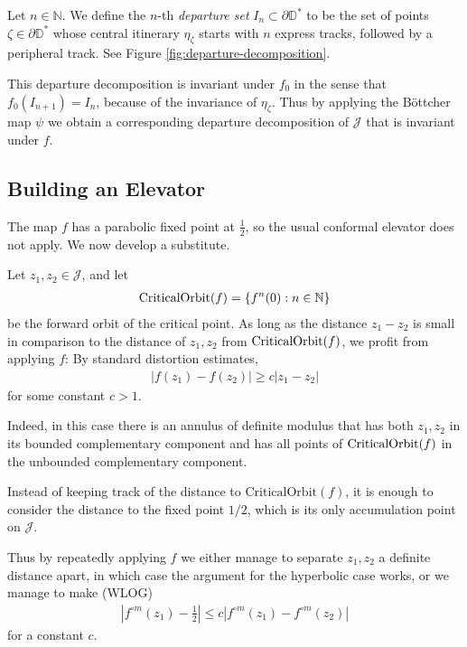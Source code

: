 \begin{definition}
Let $n \in \mathbb N$. We define the $n$-th \emph{departure set} $I_n \subset \partial \mathbb D ^*$ to be the set of points $\zeta \in \partial \mathbb D^*$ whose central itinerary $\eta_{\zeta}$ starts with $n$ express tracks, followed by a peripheral track.
See Figure \ref{fig:departure-decomposition}.
\end{definition}

This departure decomposition is invariant under $f_0$ in the sense that $f_0(I_{n+1})=I_n$, because of the invariance of $\eta _\zeta$.
Thus by applying the Böttcher map $\psi$ we obtain a corresponding departure decomposition of $\mathcal J$ that is invariant under $f$.


\subsection{Building an Elevator}

The map $f$ has a parabolic fixed point at $\frac 12$, so the usual conformal elevator does not apply. We now develop a substitute.

Let $z_1,z_2 \in \mathcal J$, and let
\begin{align*}
	\operatorname{CriticalOrbit}(f)=\{f^n(0): n \in \mathbb N\}
\end{align*} be the forward orbit of the critical point.
As long as the distance $z_1-z_2$ is small in comparison to the distance of $z_1,z_2$ from $\operatorname{CriticalOrbit}(f)$, we profit from applying $f$: By standard distortion estimates, 
\begin{align*}
|f(z_1)-f(z_2)|\geq c |z_1-z_2|
\end{align*}
for some constant $c>1$.

Indeed, in this case there is an annulus of definite modulus that has both $z_1,z_2$ in its bounded complementary component and has all points of $\operatorname{CriticalOrbit}(f)$ in the unbounded complementary component.

Instead of keeping track of the distance to $\mathrm{CriticalOrbit}(f)$, it is enough to consider the distance to the fixed point $1/2$, which is its only accumulation point on $\mathcal J$.

Thus by repeatedly applying $f$ we either manage to separate $z_1,z_2$ a definite distance apart, in which case the argument for the hyperbolic case works, or we manage to make (WLOG) 
\begin{align*}
|f^{\circ m} (z_1)-\frac 12| \leq c |f^{\circ m} (z_1)-f^{\circ m} (z_2)|
\end{align*}
for a constant $c$.

